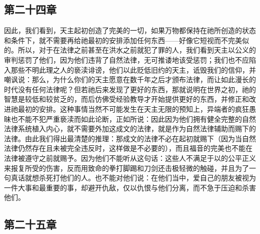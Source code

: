 
\subsection{第二十四章}

\par

因此，我们看到，天主起初创造了完美的一切，如果万物都保持在祂所创造的状态和条件下，就不需要再给祂最初的安排添加任何东西——好像它短视而不完美似的。所以，对于在法律之前甚至在洪水之前就犯了罪的人，我们看到天主以公义的审判惩罚了他们，因为他们违背了自然法律，无可推诿地该受惩罚；我们也不应陷入那些不明此理之人的亵渎诽谤，他们以此贬低旧约的天主，诋毁我们的信仰，并嘲讽说：那么，为什么你们的天主愿意在数千年之后才颁布法律，而让如此漫长的时代没有任何法律呢？但若祂后来发现了更好的东西，那就说明在世界之初，祂的智慧是较低和较贫乏的，而后仿佛受经验教导才开始提供更好的东西，并修正和改进祂最初的安排。这种事情当然不可能发生在天主无限的预知上，异端者的疯狂愚昧也不能不犯严重亵渎而如此论断，正如所说：因此因为他们拥有健全完整的自然法律系统植入内心，就不需要外加这成文的法律，就是作为自然法律辅助而赐下的法律。由此我们得出最清楚的推理：那成文的法律不必在起初就赐下（因为当自然法律仍然存在且未被完全违反时，这样做是不必要的），而且福音的完美也不能在法律被遵守之前就赐予。因为他们不能听从这句话：这些人不满足于以的公平正义来报复所受的伤害，反而用致命的拳打脚踢和刀剑还击极轻微的触碰，并且为了一句真话就想杀死打他们的人。也不能对他们说：在他们当中，爱自己的朋友被视为一件大事和最重要的事，却避开仇敌，仅以仇恨与他们分离，而不急于压迫和杀害他们。\par


\subsection{第二十五章}

\par

